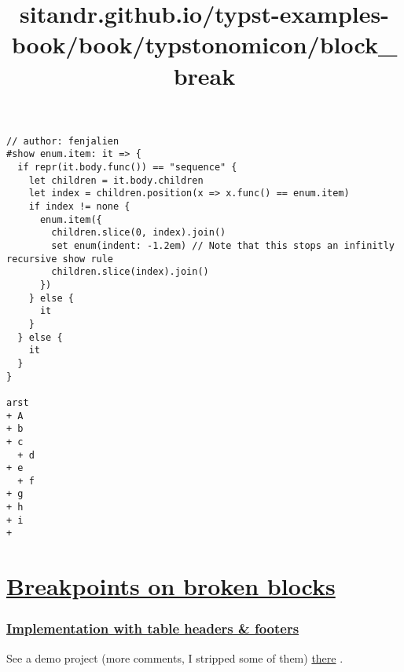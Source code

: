 \begin{verbatim}
// author: fenjalien
#show enum.item: it => {
  if repr(it.body.func()) == "sequence" {
    let children = it.body.children
    let index = children.position(x => x.func() == enum.item)
    if index != none {
      enum.item({
        children.slice(0, index).join()
        set enum(indent: -1.2em) // Note that this stops an infinitly recursive show rule
        children.slice(index).join()
      })
    } else {
      it
    }
  } else {
    it
  }
}

arst
+ A
+ b
+ c
  + d
+ e
  + f
+ g
+ h
+ i
+ 
\end{verbatim}

\pandocbounded{}


\title{sitandr.github.io/typst-examples-book/book/typstonomicon/block_break}

\section{\texorpdfstring{\hyperref[breakpoints-on-broken-blocks]{Breakpoints
on broken
blocks}}{Breakpoints on broken blocks}}\label{breakpoints-on-broken-blocks}

\subsubsection{\texorpdfstring{\hyperref[implementation-with-table-headers--footers]{Implementation
with table headers \&
footers}}{Implementation with table headers \& footers}}\label{implementation-with-table-headers--footers}

See a demo project (more comments, I stripped some of them)
\href{https://typst.app/project/r-yQHF952iFnPme9BWbRu3}{there} .

